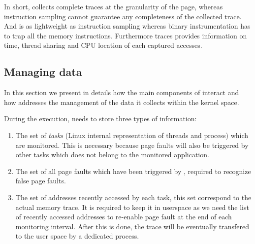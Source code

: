 In short, \Moca collects complete traces at the granularity of the page, whereas instruction
sampling cannot guarantee any completeness of the collected trace. And \Moca is as lightweight
as instruction sampling whereas binary instrumentation has to trap all the memory instructions.
Furthermore \Moca traces provides information on time, thread sharing and CPU
location of each captured accesses.


\subsection{Managing data}
\label{sec:design-tech}

In this section we present in details how the main components of \Moca
interact and how \Moca addresses the management of the data it collects
within the kernel space.

During the execution, \Moca needs to store three types of information:
\begin{enumerate}
    \item The set of \emph{tasks} (Linux internal representation of threads and process) which are
monitored. This is necessary because page faults will also be triggered by other tasks which does not belong to
the monitored application.
    \item The set of all page faults which have been triggered by \Moca,
        required to recognize false page faults.
    \item The set of addresses recently accessed by each task, this set
        correspond to the actual memory trace. It is required to keep it in
        userspace as we need the list of recently accessed addresses to
        re-enable page fault at the end of each monitoring interval. After
        this is done, the trace will be eventually transfered to
        the user space by a dedicated process.
\end{enumerate}

